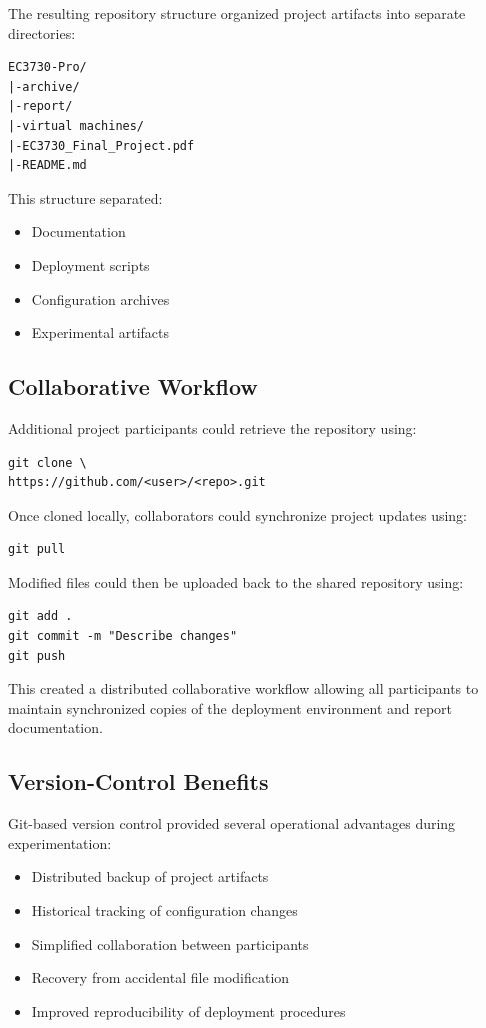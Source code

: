 \documentclass[conference]{IEEEtran}
\begin{document}
The resulting repository structure organized project artifacts into separate directories:

\begin{lstlisting}
EC3730-Pro/
|-archive/
|-report/
|-virtual machines/
|-EC3730_Final_Project.pdf
|-README.md
\end{lstlisting}

This structure separated:
\begin{itemize}
    \item Documentation
    \item Deployment scripts
    \item Configuration archives
    \item Experimental artifacts
\end{itemize}

\subsection{Collaborative Workflow}

Additional project participants could retrieve the repository using:

\begin{lstlisting}
git clone \
https://github.com/<user>/<repo>.git
\end{lstlisting}

Once cloned locally, collaborators could synchronize project updates using:

\begin{lstlisting}
git pull
\end{lstlisting}

Modified files could then be uploaded back to the shared repository using:

\begin{lstlisting}
git add .
git commit -m "Describe changes"
git push
\end{lstlisting}

This created a distributed collaborative workflow allowing all participants to maintain synchronized copies of the deployment environment and report documentation.

\subsection{Version-Control Benefits}

Git-based version control provided several operational advantages during experimentation:

\begin{itemize}
    \item Distributed backup of project artifacts
    \item Historical tracking of configuration changes
    \item Simplified collaboration between participants
    \item Recovery from accidental file modification
    \item Improved reproducibility of deployment procedures
\end{itemize}
\end{document}
